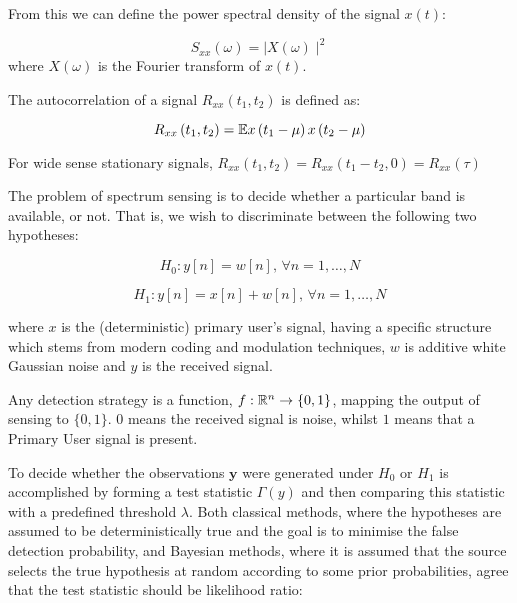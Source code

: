 From this we can define the power spectral density of the signal \(x\left(t\right)\):

\begin{definition}
\begin{equation}
S_{xx} \left(\omega\right) = \mid X\left(\omega\right) \mid^2
\end{equation}
where \(X\left(\omega\right)\) is the Fourier transform of \(x\left(t\right)\).
\end{definition}

\begin{definition}[Autocorrelation]
The autocorrelation of a signal \(R_{xx}\left(t_1, t_2\right)\) is defined as:

\begin{equation}
R_{xx}\left(t_1, t_2\right) = {\mathbb{E}}{x\left(t_1-\mu\right)x\left(t_2-\mu\right)}
\end{equation}

For wide sense stationary signals, \( R_{xx}\left(t_1, t_2\right) = R_{xx}\left(t_1 - t_2,0\right) = R_{xx}\left(\tau\right) \)

\end{definition}

The problem of spectrum sensing \cite{yucek2009survey} is to decide whether a particular band is available, or not. That is, we wish to discriminate between the following two hypotheses:


\begin{equation}
H_{0}: y\left[n\right] = w\left[n\right] \text{, } \forall n =  1, \ldots, N 
\end{equation}
\label{h1}

\begin{equation}
H_{1}: y\left[n \right] = x\left[n\right] + w\left[n\right] \text{, } \forall n = 1, \ldots, N 
\end{equation}
\label{h2}

where \(x\) is the (deterministic) primary user's signal, having a specific structure which stems from modern coding and modulation techniques, \(w\) is additive white Gaussian noise and \(y\) is the received signal.

Any detection strategy is a function, \(f: {\mathbb{R}}^n \rightarrow \{0,1\}\), mapping the output of sensing to \(\{0, 1\}\). \(0\) means the received signal is noise, whilst \(1\) means that a Primary User signal is present.

To decide whether the observations \(\textbf{y}\) were generated under \(\textit{H}_{0}\) or \(\textit{H}_{1}\) is accomplished by forming a test statistic \(\Gamma\left(y\right)\) and then comparing this statistic with a predefined threshold \(\lambda\). Both classical methods, where the hypotheses are assumed to be deterministically true and the goal is to minimise the false detection probability, and Bayesian methods, where it is assumed that the source selects the true hypothesis at random according to some prior probabilities, agree that the test statistic should be likelihood ratio:

